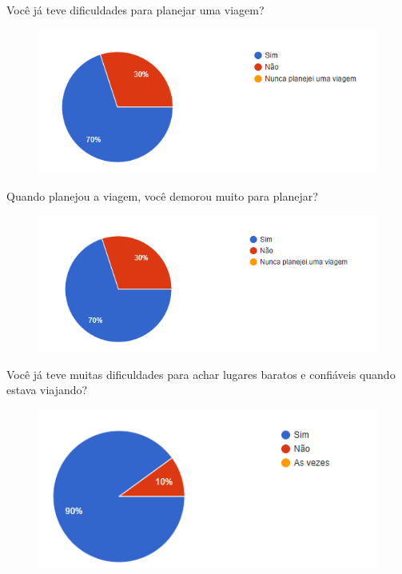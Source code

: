 \documentclass{article}
\begin{document}
Você já teve dificuldades para planejar uma viagem?
\begin{figure}[H]
      \centering
      \includegraphics [width=1\textwidth]{IMGDOC/Dificuldades planejar.png}
      \label{Pesquisa3}
\end{figure}

Quando planejou a viagem, você demorou muito para planejar?
\begin{figure}[H]
      \centering
      \includegraphics [width=1\textwidth]{IMGDOC/Demora planejar.png}
      \label{Pesquisa4}
\end{figure}

Você já teve muitas dificuldades para achar lugares baratos e confiáveis quando estava viajando?
\begin{figure}[H]
      \centering
      \includegraphics [width=1\textwidth]{IMGDOC/Dificuldades achar.png}
      \label{Pesquisa5}
\end{figure}
\end{document}
